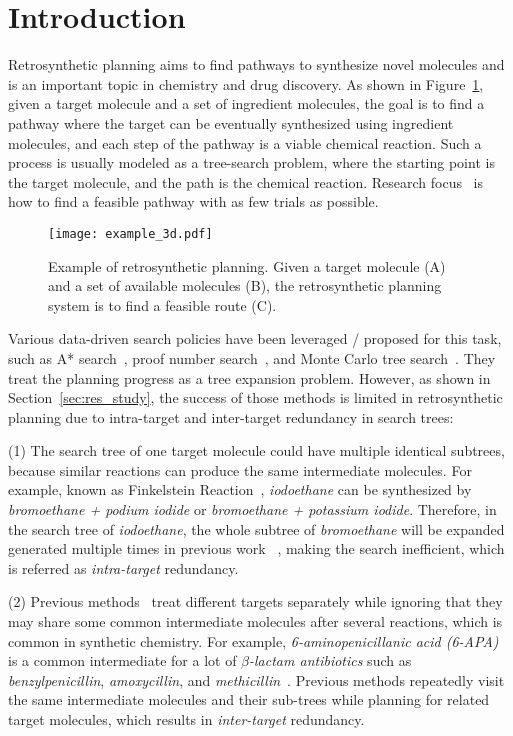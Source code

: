 \documentclass[sigconf]{acmart}
\begin{document}
\section{Introduction}
Retrosynthetic planning aims to find pathways to synthesize novel molecules and is an important topic in chemistry and drug discovery.
As shown in Figure~\ref{fig:intro}, given a target molecule and a set of ingredient molecules, the goal is to find a pathway where the target can be eventually synthesized using ingredient molecules, and each step of the pathway is a viable chemical reaction. Such a process is usually modeled as a tree-search problem, where the starting point is the target molecule, and the path is the chemical reaction.
Research focus~\cite{Chen2020,Kim2021,Hong2021} is how to find a feasible pathway with as few trials as possible.


\begin{figure}[!htbp]
\centering
\texttt{[image: example\_3d.pdf]}
\caption{Example of retrosynthetic planning. Given a target molecule (A) and a set of available molecules (B), the retrosynthetic planning system is to find a feasible route (C).}
\label{fig:intro}
\end{figure}


Various data-driven search policies have been leveraged / proposed for this task, such as A* search~\citep{Chen2020}, proof number search~\citep{kishimoto2019depth}, and Monte Carlo tree search~\citep{Hong2021}. They treat the planning progress as a tree expansion problem. 
However, as shown in Section~\ref{sec:res_study}, the success of those methods is limited  in retrosynthetic planning due to intra-target and inter-target redundancy in search trees:

(1) The search tree of one target molecule could have multiple identical subtrees, because similar reactions can produce the same intermediate molecules. For example, known as Finkelstein Reaction~\citep{finkelstein1910darstellung}, \textit{iodoethane} can be synthesized by \textit{bromoethane + podium iodide} or \textit{bromoethane + potassium iodide}. Therefore, in the search tree of \textit{iodoethane}, the whole subtree of \textit{bromoethane} will be expanded generated multiple times in previous work~\cite{Chen2020,Kim2021} , making the search inefficient, which is referred as \emph{intra-target} redundancy. 

(2) Previous methods~\cite{Chen2020,Kim2021} treat different targets separately while ignoring that they may share some common intermediate molecules after several reactions, which is common in synthetic chemistry.
For example, \textit{6-aminopenicillanic acid (6-APA)} is a common intermediate for a lot of \textit{$\beta$-lactam antibiotics} such as \textit{benzylpenicillin}, \textit{amoxycillin}, and \textit{methicillin}~\cite{batchelor1959synthesis}.
Previous methods repeatedly visit the same intermediate molecules and their sub-trees while planning for related target molecules, which results in \emph{inter-target} redundancy.
\end{document}
